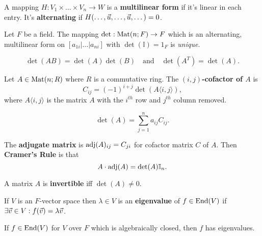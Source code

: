 \begin{multicols}{2}
\begin{definition}
A mapping $H:V_1\times\dots\times V_n\to W$ is a \textbf{multilinear form} if it's linear in each entry. It's \textbf{alternating} if $H(\dots,\vec{u},\dots,\vec{u},\dots)=0$.
\end{definition}

\begin{theorem}[4.3.6]
Let $F$ be a field. The mapping $\det:\mathrm{Mat}(n;F)\to F$ which is an alternating, multilinear form on $[a_{1i}|\dots|a_{ni}]$ with $\det(\mathbb{I})=1_F$ is \textit{unique}.
\end{theorem}

\begin{theorem}[4.4.1,4.4.4]
    \[
    \det(AB)=\det(A)\det(B)
    \quad\text{and}\quad
    \det(A^T)=\det(A).
    \]
\end{theorem}

\begin{definition}
Let $A\in\mathrm{Mat}(n;R)$ where $R$ is a commutative ring. The \textbf{$(i,j)$-cofactor of $A$} is
    \[
    C_{ij} = (-1)^{i+j}\det(A\langle i,j\rangle),
    \]
where $A\langle i,j\rangle$ is the matrix $A$ with the $i^{th}$ row and $j^{th}$ column removed.
\end{definition}

\begin{theorem}[4.4.7]
    \[
    \det(A) = \sum_{j=1}^n a_{ij}C_{ij}.
    \]
\end{theorem}

\begin{theorem}[4.4.9]
The \textbf{adjugate matrix} is $\mathrm{adj}(A)_{ij}=C_{ji}$ for cofactor matrix $C$ of $A$. Then \textbf{Cramer's Rule} is that
    \[
    A\cdot\mathrm{adj}(A) = \det(A)\mathbb{I}_n.
    \]
\end{theorem}

\begin{theorem}[4.4.11]
A matrix $A$ is \textbf{invertible} iff $\det(A)\neq0$.
\end{theorem}

\begin{definition}
If $V$ is an $F$-vector space then $\lambda\in V$ is an \textbf{eigenvalue} of $f\in\mathrm{End}(V)$ if $\exists\vec{v}\in V: f(\vec{v})=\lambda\vec{v}$.
\end{definition}

\begin{theorem}[4.5.4]
If $f\in\mathrm{End}(V)$ for $V$ over $F$ which is algebraically closed, then $f$ has eigenvalues.
\end{theorem}


\end{multicols}
